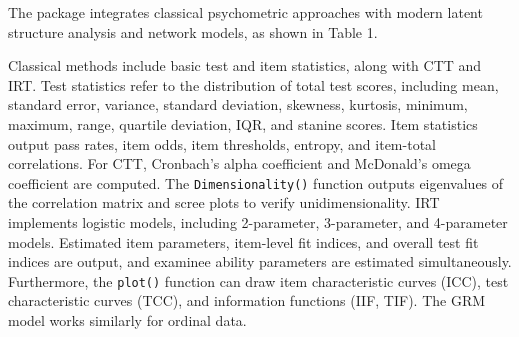 The package integrates classical psychometric approaches with modern latent structure analysis and network models, as shown in Table 1.

\begin{table}[!h]
\centering
\caption{\label{tab:table1}Main Analysis Models in exametrika}
\centering
{}
\end{table}

Classical methods include basic test and item statistics, along with CTT and IRT. Test statistics refer to the distribution of total test scores, including mean, standard error, variance, standard deviation, skewness, kurtosis, minimum, maximum, range, quartile deviation, IQR, and stanine scores. Item statistics output pass rates, item odds, item thresholds, entropy, and item-total correlations. For CTT, Cronbach's alpha coefficient and McDonald's omega coefficient are computed. The \texttt{Dimensionality()} function outputs eigenvalues of the correlation matrix and scree plots to verify unidimensionality. IRT implements logistic models, including 2-parameter, 3-parameter, and 4-parameter models. Estimated item parameters, item-level fit indices, and overall test fit indices are output, and examinee ability parameters are estimated simultaneously. Furthermore, the \texttt{plot()} function can draw item characteristic curves (ICC), test characteristic curves (TCC), and information functions (IIF, TIF). The GRM model works similarly for ordinal data.

